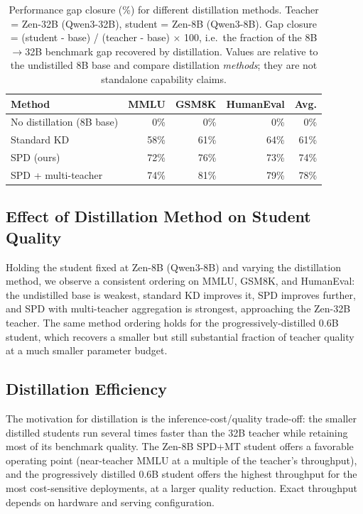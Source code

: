 \documentclass[11pt,a4paper]{article}
\begin{document}
\begin{table}[H]
\centering
\caption{Performance gap closure (\%) for different distillation methods.
Teacher = Zen-32B (Qwen3-32B), student = Zen-8B (Qwen3-8B).
Gap closure = (student - base) / (teacher - base) $\times$ 100, i.e.\ the fraction of the
8B$\to$32B benchmark gap recovered by distillation. Values are relative to the undistilled
8B base and compare distillation \emph{methods}; they are not standalone capability claims.}
\begin{tabular}{lrrrr}
\toprule
\textbf{Method} & \textbf{MMLU} & \textbf{GSM8K} & \textbf{HumanEval} & \textbf{Avg.} \\
\midrule
No distillation (8B base) & 0\%  & 0\%  & 0\%  & 0\% \\
Standard KD               & 58\% & 61\% & 64\% & 61\% \\
SPD (ours)                & 72\% & 76\% & 73\% & 74\% \\
SPD + multi-teacher       & 74\% & 81\% & 79\% & 78\% \\
\bottomrule
\end{tabular}
\label{tab:gap_closure}
\end{table}

\subsection{Effect of Distillation Method on Student Quality}

Holding the student fixed at Zen-8B (Qwen3-8B) and varying the distillation method, we
observe a consistent ordering on MMLU, GSM8K, and HumanEval: the undistilled base is
weakest, standard KD improves it, SPD improves further, and SPD with multi-teacher
aggregation is strongest, approaching the Zen-32B teacher. The same method ordering holds
for the progressively-distilled 0.6B student, which recovers a smaller but still
substantial fraction of teacher quality at a much smaller parameter budget.

\subsection{Distillation Efficiency}

The motivation for distillation is the inference-cost/quality trade-off: the smaller
distilled students run several times faster than the 32B teacher while retaining most of
its benchmark quality. The Zen-8B SPD+MT student offers a favorable operating point
(near-teacher MMLU at a multiple of the teacher's throughput), and the progressively
distilled 0.6B student offers the highest throughput for the most cost-sensitive
deployments, at a larger quality reduction. Exact throughput depends on hardware and
serving configuration.
\end{document}
